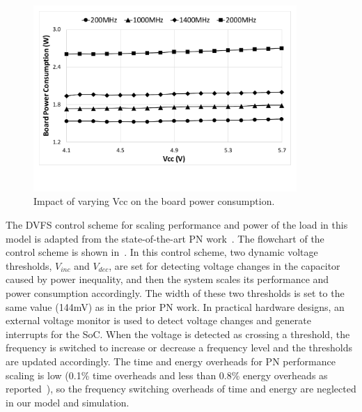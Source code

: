 \begin{figure} [!tb]
    \centering
    \includegraphics[width=10cm]{figure/work2/vc_pc}
    \caption{Impact of varying Vcc on the board power consumption.}
    \label{Figure:vc_pc}
\end{figure} 

The DVFS control scheme for scaling performance and power of the load in this model is adapted from the state-of-the-art PN work~\cite{fletcher2017power}. The flowchart of the control scheme is shown in~. In this control scheme, two dynamic voltage thresholds, $V_{inc}$ and $V_{dec}$, are set for detecting voltage changes in the capacitor caused by power inequality, and then the system scales its performance and power consumption accordingly. The width of these two thresholds is set to the same value (144mV) as in the prior PN work. In practical hardware designs, an external voltage monitor is used to detect voltage changes and generate interrupts for the SoC. When the voltage is detected as crossing a threshold, the frequency is switched to increase or decrease a frequency level and the thresholds are updated accordingly. The time and energy overheads for PN performance scaling is low (0.1\% time overheads and less than 0.8\% energy overheads as reported~\cite{fletcher2017power}), so the frequency switching overheads of time and energy are neglected in our model and simulation.

